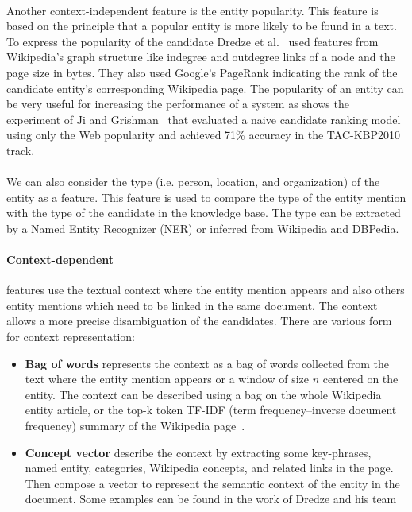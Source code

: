 \paragraph{} Another context-independent feature is the entity popularity. This feature is based on the principle that a popular entity is more likely to be found in a text. To express the popularity of the candidate Dredze et al.~\cite{dredze2010entity} used features from Wikipedia's graph structure like indegree and outdegree links of a node and the page size in bytes. They also used Google's PageRank indicating the rank of the candidate entity's corresponding Wikipedia page. The popularity of an entity can be very useful for increasing the performance of a system as shows the experiment of Ji and Grishman~\cite{ji2011knowledge} that evaluated a naive candidate ranking model using only the Web popularity and achieved 71\% accuracy in the TAC-KBP2010 track.

\paragraph{} We can also consider the type (i.e. person, location, and organization) of the entity as a feature. This feature is used to compare the type of the entity mention with the type of the candidate in the knowledge base. The type can be extracted by a Named Entity Recognizer (NER) or inferred from Wikipedia and DBPedia.

\paragraph{Context-dependent} features use the textual context where the entity mention appears and also others entity mentions which need to be linked in the same document. The context allows a more precise disambiguation of the candidates. There are various form for context representation:

\begin{itemize}[topsep=10pt]
\item \textbf{Bag of words} represents the context as a bag of words collected from the text where the entity mention appears or a window of size $n$ centered on the entity. The context can be described using a bag on the whole Wikipedia entity article, or the top-k token TF-IDF (term frequency–inverse document frequency) summary of the Wikipedia page~\cite{ratinov2011local}.  

\item \textbf{Concept vector} describe the context by extracting some key-phrases, named entity, categories, Wikipedia concepts, and related links in the page. Then compose a vector to represent the semantic context of the entity in the document. Some examples can be found in the work of Dredze and his team~\cite{dredze2010entity}
\end{itemize}

